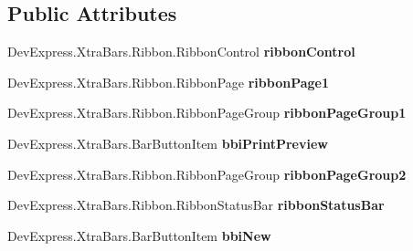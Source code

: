 \subsection*{Public Attributes}
\begin{DoxyCompactItemize}
\item 
\mbox{\label{class_h_k_supply_1_1_forms_1_1_ribbon_form_base_a580f0ead3ebf8727b9b18718b5fb52e6}} 
Dev\+Express.\+Xtra\+Bars.\+Ribbon.\+Ribbon\+Control {\bfseries ribbon\+Control}
\item 
\mbox{\label{class_h_k_supply_1_1_forms_1_1_ribbon_form_base_aa2fd598d8dce0cf3ade5f2e4286b1a63}} 
Dev\+Express.\+Xtra\+Bars.\+Ribbon.\+Ribbon\+Page {\bfseries ribbon\+Page1}
\item 
\mbox{\label{class_h_k_supply_1_1_forms_1_1_ribbon_form_base_ae7e0b8e80346713b6f0924eac3b90244}} 
Dev\+Express.\+Xtra\+Bars.\+Ribbon.\+Ribbon\+Page\+Group {\bfseries ribbon\+Page\+Group1}
\item 
\mbox{\label{class_h_k_supply_1_1_forms_1_1_ribbon_form_base_a1a497488427f08eac431ef74c5fa4ebd}} 
Dev\+Express.\+Xtra\+Bars.\+Bar\+Button\+Item {\bfseries bbi\+Print\+Preview}
\item 
\mbox{\label{class_h_k_supply_1_1_forms_1_1_ribbon_form_base_a56392f3fb3ffe03c6056226f7a4e9cc4}} 
Dev\+Express.\+Xtra\+Bars.\+Ribbon.\+Ribbon\+Page\+Group {\bfseries ribbon\+Page\+Group2}
\item 
\mbox{\label{class_h_k_supply_1_1_forms_1_1_ribbon_form_base_a17f7eab51489ad84d039270fdadd94e3}} 
Dev\+Express.\+Xtra\+Bars.\+Ribbon.\+Ribbon\+Status\+Bar {\bfseries ribbon\+Status\+Bar}
\item 
\mbox{\label{class_h_k_supply_1_1_forms_1_1_ribbon_form_base_afe282e9cf1935592ab30454a8cb007f7}} 
Dev\+Express.\+Xtra\+Bars.\+Bar\+Button\+Item {\bfseries bbi\+New}
\item 
\mbox{\label{class_h_k_supply_1_1_forms_1_1_ribbon_form_base_a1f152497f1ed4ab950f1efc905cf9855}} 

\end{DoxyCompactItemize}
